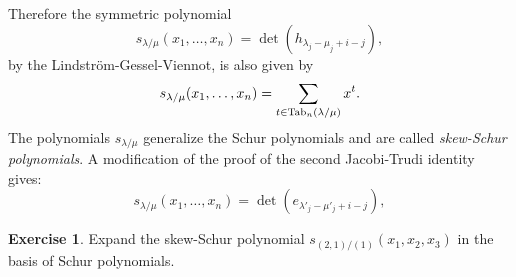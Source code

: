 \documentclass[11pt]{amsproc}
\theoremstyle{definition}
\theoremstyle{example}
\newtheorem{exercise}[theorem]{Exercise}
\newcommand{\Tab}{\textup{Tab}}
\begin{document}
Therefore the symmetric polynomial
\begin{equation}
  \label{eq:skew-jth}
  s_{\lambda/\mu}(x_1,\dotsc,x_n) = \det(h_{\lambda_j-\mu_j+i-j}),
\end{equation}
by the Lindstr\"om-Gessel-Viennot, is also given by
\begin{equation}
  \label{eq:skew-kostka}
  s_{\lambda/\mu}(x_1,\dotsc,x_n) = \sum_{t\in \Tab_n(\lambda/\mu)} x^t.
\end{equation}
The polynomials $s_{\lambda/\mu}$ generalize the Schur polynomials and are called \emph{skew-Schur polynomials}.
A modification of the proof of the second Jacobi-Trudi identity gives:
\begin{equation}
  \label{eq:skew-jti}
  s_{\lambda/\mu}(x_1,\dotsc,x_n) = \det(e_{\lambda'_j-\mu'_j+i-j}),
\end{equation}
\begin{exercise}
  Expand the skew-Schur polynomial $s_{(2,1)/(1)}(x_1,x_2,x_3)$ in the basis of Schur polynomials.
\end{exercise}
\end{document}
